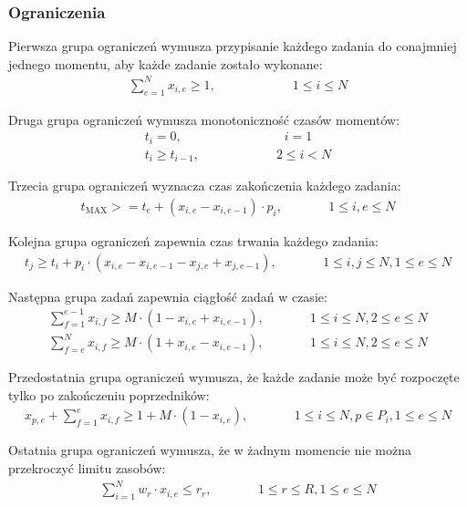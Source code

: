 \documentclass{article}
\begin{document}
\subsubsection{Ograniczenia}
Pierwsza grupa ograniczeń wymusza przypisanie każdego zadania do conajmniej jednego momentu, aby każde zadanie zostało wykonane:
\begin{align*}
    \sum_{e=1}^{N} x_{i,e} \geq 1, \qquad \qquad \qquad 1 \leq i \leq N
\end{align*}

Druga grupa ograniczeń wymusza monotoniczność czasów momentów:
\begin{align*}
    t_{i} = 0, \qquad \qquad \qquad \qquad i=1 \\
    t_{i} \geq t_{i-1}, \qquad \qquad \qquad 2 \leq i < N
\end{align*}

Trzecia grupa ograniczeń wyznacza czas zakończenia każdego zadania:
\begin{align*}
    t_{\mathrm{MAX}} >= t_{e} + (x_{i,e} - x_{i,e-1}) \cdot p_i, \qquad &&1 \leq i,e \leq N
\end{align*}

Kolejna grupa ograniczeń zapewnia czas trwania każdego zadania:
\begin{align*}
    t_{j} \geq t_{i} + p_i \cdot (x_{i,e} - x_{i,e-1} - x_{j,e} + x_{j,e-1}), \qquad &&1 \leq i,j \leq N, 1 \leq e \leq N
\end{align*}

Następna grupa zadań zapewnia ciągłość zadań w czasie:
\begin{align*}
    \sum_{f=1}^{e-1} x_{i,f} \geq M \cdot (1 - x_{i,e} + x_{i,e-1}), \qquad &&1 \leq i \leq N, 2 \leq e \leq N \\
    \sum_{f=e}^{N} x_{i,f} \geq M \cdot (1 + x_{i,e} - x_{i,e-1}), \qquad &&1 \leq i \leq N, 2 \leq e \leq N
\end{align*}

Przedostatnia grupa ograniczeń wymusza, że każde zadanie może być rozpoczęte tylko po zakończeniu poprzedników:
\begin{align*}
    x_{p,e} + \sum_{f=1}^{e} x_{i,f} \geq 1 + M \cdot (1 - x_{i,e}), \qquad &&1 \leq i \leq N, p \in P_i, 1 \leq e \leq N
\end{align*}

Ostatnia grupa ograniczeń wymusza, że w żadnym momencie nie można przekroczyć limitu zasobów:
\begin{align*}
    \sum_{i=1}^{N} w_{r} \cdot x_{i,e} \leq r_r, \qquad &&1 \leq r \leq R, 1 \leq e \leq N
\end{align*}
\end{document}

